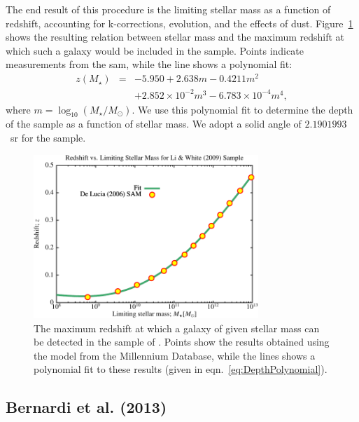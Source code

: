 The end result of this procedure is the limiting stellar mass as a function of redshift, accounting for k-corrections, evolution, and the effects of dust. Figure~\ref{fig:SDSSDepthFit} shows the resulting relation between stellar mass and the maximum redshift at which such a galaxy would be included in the sample. Points indicate measurements from the \gls{sam}, while the line shows a polynomial fit:
\begin{eqnarray}
 z(M_\star) &=& -5.950 + 2.638 m - 0.4211 m^2 \nonumber \\ 
            & & + 2.852\times 10^{-2} m^3 - 6.783 \times 10^{-4} m^4,
 \label{eq:DepthPolynomial}
\end{eqnarray}
where $m= \log_{10}(M_\star/M_\odot)$. We use this polynomial fit to determine the depth of the sample as a function of stellar mass. We adopt a solid angle of $2.1901993$~sr \citep{percival_shape_2007} for the sample.

\begin{figure}
 \begin{center}
 \includegraphics[width=85mm,trim=0mm 0mm 0mm 4mm,clip]{Plots/DataAnalysis/SDSSMassLuminosityRelation.pdf}
 \end{center}
 \caption{The maximum redshift at which a galaxy of given stellar mass can be detected in the sample of \protect\cite{li_distribution_2009}. Points show the results obtained using the \protect\cite{de_lucia_hierarchical_2007} model from the Millennium Database, while the lines shows a polynomial fit to these results (given in eqn.~\ref{eq:DepthPolynomial}).}
 \label{fig:SDSSDepthFit}
\end{figure}

\subsection{Bernardi et al. (2013)}\label{phys:surveyGeometry:surveyGeometryBernardi2013SDSS}

